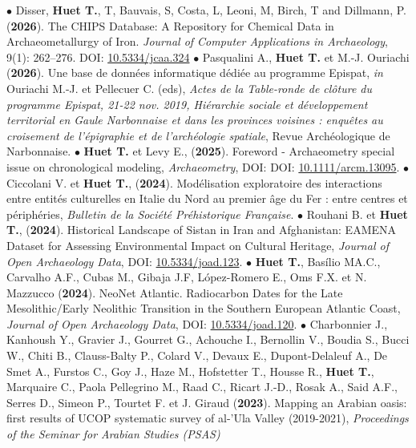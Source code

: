 \documentclass{article}
\begin{document}
$\bullet$ Disser, \textbf{Huet T.}, T, Bauvais, S, Costa, L, Leoni, M, Birch, T and Dillmann, P. ({\textbf{2026}}). The CHIPS Database: A Repository for Chemical Data in Archaeometallurgy of Iron. \textit{Journal of Computer Applications in Archaeology}, 9(1): 262–276. DOI: \href{https://doi.org/10.5334/jcaa.324}{10.5334/jcaa.324} 
$\bullet$ Pasqualini A., \textbf{Huet T.} et M.-J. Ouriachi ({\textbf{2026}}). Une base de données informatique dédiée au programme Epispat, \textit{in} Ouriachi M.-J. et Pellecuer C. (eds), \textit{Actes de la Table-ronde de cl\^{o}ture du programme Epispat, 21-22 nov. 2019, Hi\'{e}rarchie sociale et d\'{e}veloppement territorial en Gaule Narbonnaise et dans les provinces voisines : enqu\^{e}tes au croisement de l'\'{e}pigraphie et de l'arch\'{e}ologie spatiale}, Revue Arch\'{e}ologique de Narbonnaise.
\smallbreak
$\bullet$ \textbf{Huet T.} et Levy E., (\textbf{2025}). Foreword - Archaeometry special issue on chronological modeling, \textit{Archaeometry}, DOI:  DOI: \href{https://doi.org/10.1111/arcm.13095}{10.1111/arcm.13095}. 
\smallbreak
$\bullet$ Ciccolani V. et \textbf{Huet T.}, (\textbf{2024}). Modélisation exploratoire des interactions entre entités culturelles en Italie du Nord au premier âge du Fer : entre centres et périphéries, \textit{Bulletin de la Soci\'{e}t\'{e} Pr\'{e}historique Fran\c{c}aise}.
\smallbreak
$\bullet$ Rouhani B. et \textbf{Huet T.}, (\textbf{2024}). Historical Landscape of Sistan in Iran and Afghanistan: EAMENA Dataset for Assessing Environmental Impact on Cultural Heritage, \textit{Journal of Open Archaeology Data}, DOI: \href{https://openarchaeologydata.metajnl.com/articles/10.5334/joad.123}{10.5334/joad.123}.
\smallbreak
$\bullet$ \textbf{Huet T.}, Basílio MA.C., Carvalho A.F., Cubas M., Gibaja J.F, López-Romero E., Oms F.X. et N. Mazzucco (\textbf{2024}). NeoNet Atlantic. Radiocarbon Dates for the Late Mesolithic/Early Neolithic Transition in the Southern European Atlantic Coast, \textit{Journal of Open Archaeology Data}, DOI: \href{https://openarchaeologydata.metajnl.com/articles/10.5334/joad.120}{10.5334/joad.120}.
\smallbreak
$\bullet$ Charbonnier J., Kanhoush Y., Gravier J., Gourret G., Achouche I., Bernollin V., Boudia S., Bucci W., Chiti B., Clauss-Balty P., Colard V., Devaux E., Dupont-Delaleuf A., De Smet A., Furstos C., Goy J., Haze M., Hofstetter T., Housse R., \textbf{Huet T.}, Marquaire C., Paola Pellegrino M., Raad C., Ricart J.-D., Rosak A., Said A.F., Serres D., Simeon P., Tourtet F. et J. Giraud (\textbf{2023}). Mapping an Arabian oasis: first results of UCOP systematic survey of al-'Ula Valley (2019-2021), \textit{Proceedings of the Seminar for Arabian Studies (PSAS)}
\end{document}
